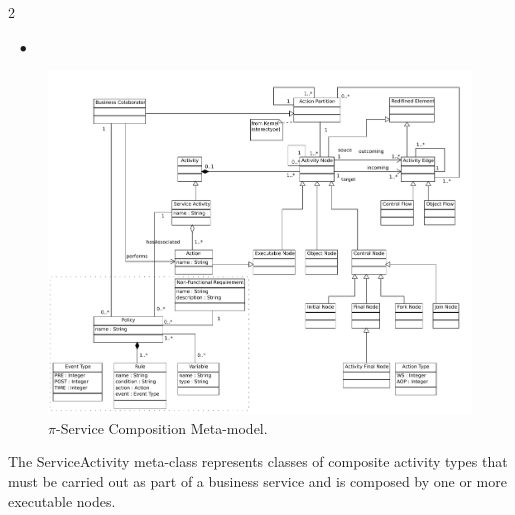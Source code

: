 \documentclass[12pt,twoside]{article}
\theoremstyle{plain}
\theoremstyle{plain}
\newenvironment{itemizedTrivlist}{\begin{list}{\rm ~\hspace{2mm} $\bullet$\ }
                                         {\setlength{\leftmargin}{0pt}
                                          \setlength{\rightmargin}{0pt}
                                          \setlength{\itemindent}{12pt}
                                          \setlength{\listparindent}{0pt}}}
                            {\end{list}}
\begin{document}
\begin{multicols}{2}
\begin{itemizedTrivlist}
\begin{figure}
\centering
\includegraphics[width=1.0\textwidth]{PiServiceComposition}
\caption{$\pi$-Service Composition Meta-model.}
\label{fig:e-scomposition-metamodel}
\end{figure}

\item The {\sc ServiceActivity} meta-class represents classes of composite activity types that must be carried out as part of a business service and is composed by one or more execu\-ta\-ble nodes.


\end{itemizedTrivlist}
\end{multicols}
\end{document}
